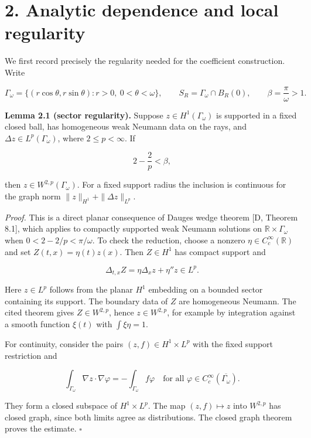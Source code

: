\documentclass[11pt]{article}
\begin{document}
\section{2. Analytic dependence and local
regularity}\label{analytic-dependence-and-local-regularity}

We first record precisely the regularity needed for the coefficient
construction. Write

\[
\Gamma_\omega=\{(r\cos\theta,r\sin\theta):r>0,\ 0<\theta<\omega\},
\qquad S_R=\Gamma_\omega\cap B_R(0),
\qquad \beta=\frac\pi\omega>1.
\tag{2.1}
\]

\textbf{Lemma 2.1 (sector regularity).} Suppose
\(z\in H^1(\Gamma_\omega)\) is supported in a fixed closed ball, has
homogeneous weak Neumann data on the rays, and
\(\Delta z\in L^p(\Gamma_\omega)\), where \(2\le p<\infty\). If

\[
2-\frac2p<\beta,
\tag{2.2}
\]

then \(z\in W^{2,p}(\Gamma_\omega)\). For a fixed support radius the
inclusion is continuous for the graph norm
\(\|z\|_{H^1}+\|\Delta z\|_{L^p}\).

\emph{Proof.} This is a direct planar consequence of
Dauge\textquotesingle s wedge theorem {[}D, Theorem 8.1{]}, which
applies to compactly supported weak Neumann solutions on
\(\mathbb R\times\Gamma_\omega\) when \(0<2-2/p<\pi/\omega\). To check
the reduction, choose a nonzero \(\eta\in C_c^\infty(\mathbb R)\) and
set \(Z(t,x)=\eta(t)z(x)\). Then \(Z\in H^1\) has compact support and

\[
\Delta_{t,x}Z=\eta\Delta_xz+\eta''z\in L^p.
\tag{2.3}
\]

Here \(z\in L^p\) follows from the planar \(H^1\) embedding on a bounded
sector containing its support. The boundary data of \(Z\) are
homogeneous Neumann. The cited theorem gives \(Z\in W^{2,p}\), hence
\(z\in W^{2,p}\), for example by integration against a smooth function
\(\xi(t)\) with \(\int\xi\eta=1\).

For continuity, consider the pairs \((z,f)\in H^1\times L^p\) with the
fixed support restriction and

\[
\int_{\Gamma_\omega}\nabla z\cdot\nabla\varphi
=-\int_{\Gamma_\omega}f\varphi
\quad\text{for all }\varphi\in C_c^\infty(\overline{\Gamma_\omega}).
\tag{2.4}
\]

They form a closed subspace of \(H^1\times L^p\). The map
\((z,f)\mapsto z\) into \(W^{2,p}\) has closed graph, since both limits
agree as distributions. The closed graph theorem proves the estimate. \(\square\)
\end{document}
